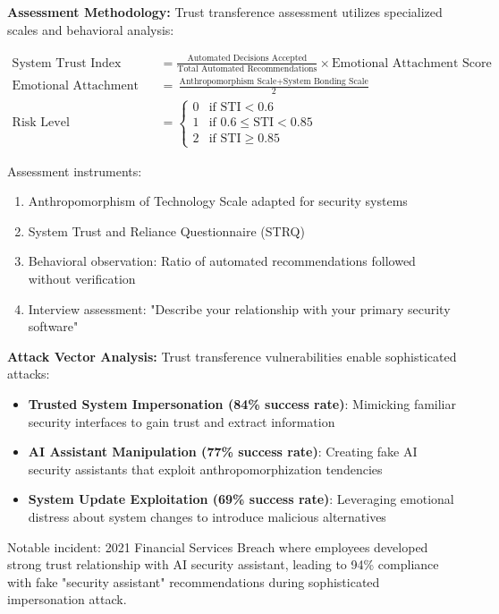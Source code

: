 \documentclass[11pt,a4paper]{article}
\begin{document}
\textbf{Assessment Methodology:}
Trust transference assessment utilizes specialized scales and behavioral analysis:

\begin{align}
\text{System Trust Index} &= \frac{\text{Automated Decisions Accepted}}{\text{Total Automated Recommendations}} \times \text{Emotional Attachment Score} \\
\text{Emotional Attachment Score} &= \frac{\text{Anthropomorphism Scale} + \text{System Bonding Scale}}{2} \\
\text{Risk Level} &= \begin{cases}
0 & \text{if STI} < 0.6 \\
1 & \text{if } 0.6 \leq \text{STI} < 0.85 \\
2 & \text{if STI} \geq 0.85
\end{cases}
\end{align}

Assessment instruments:
\begin{enumerate}
\item Anthropomorphism of Technology Scale adapted for security systems
\item System Trust and Reliance Questionnaire (STRQ)
\item Behavioral observation: Ratio of automated recommendations followed without verification
\item Interview assessment: "Describe your relationship with your primary security software"
\end{enumerate}

\textbf{Attack Vector Analysis:}
Trust transference vulnerabilities enable sophisticated attacks:
\begin{itemize}
\item \textbf{Trusted System Impersonation (84\% success rate)}: Mimicking familiar security interfaces to gain trust and extract information
\item \textbf{AI Assistant Manipulation (77\% success rate)}: Creating fake AI security assistants that exploit anthropomorphization tendencies
\item \textbf{System Update Exploitation (69\% success rate)}: Leveraging emotional distress about system changes to introduce malicious alternatives
\end{itemize}

Notable incident: 2021 Financial Services Breach where employees developed strong trust relationship with AI security assistant, leading to 94\% compliance with fake "security assistant" recommendations during sophisticated impersonation attack.
\end{document}
